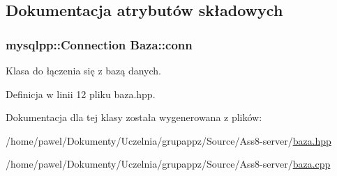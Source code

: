 \subsection{Dokumentacja atrybutów składowych}
\hypertarget{a00001_f966364deec225fdf2d2d22550c71c88}{
\subsubsection[{conn}]{\setlength{\rightskip}{0pt plus 5cm}mysqlpp::Connection {\bf Baza::conn}}}
\label{d8/d84/a00001_f966364deec225fdf2d2d22550c71c88}


Klasa do łączenia się z bazą danych. 



Definicja w linii 12 pliku baza.hpp.

Dokumentacja dla tej klasy została wygenerowana z plików:\begin{CompactItemize}
\item 
/home/pawel/Dokumenty/Uczelnia/grupappz/Source/Ass8-server/\hyperlink{a00007}{baza.hpp}\item 
/home/pawel/Dokumenty/Uczelnia/grupappz/Source/Ass8-server/\hyperlink{a00006}{baza.cpp}\end{CompactItemize}
